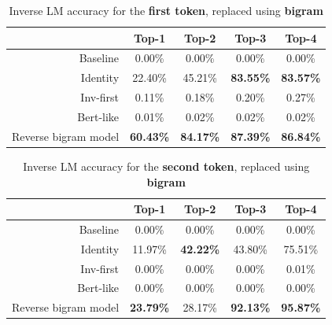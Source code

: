 \documentclass[../thesis.tex]{subfiles}
\begin{document}
\begin{table}[bthp]
\centering
\begin{tabular}{rcccc}
\toprule
          & \textbf{Top-1}   & \textbf{Top-2}   & \textbf{Top-3}   & \textbf{Top-4}   \\
\midrule
Baseline  & 0.00\%           & 0.00\%           & 0.00\%           & 0.00\%           \\
Identity  & 22.40\%          & 45.21\%          & \textbf{83.55\%} & \textbf{83.57\%} \\
Inv-first & 0.11\%           & 0.18\%           & 0.20\%           & 0.27\%           \\
Bert-like & 0.01\%           & 0.02\%           & 0.02\%           & 0.02\%           \\
Reverse bigram model & \textbf{60.43\%} & \textbf{84.17\%} & \textbf{87.39\%} & \textbf{86.84\%} \\
\bottomrule
\end{tabular}
\vspace{0.25cm}
\caption{Inverse LM accuracy for the \textbf{first token}, replaced using \textbf{bigram}}
\label{table:tinystories__inversion_first_token_bigram}
\end{table}


\begin{table}[bthp]
\centering
\begin{tabular}{rcccc}
\toprule
          & \textbf{Top-1} & \textbf{Top-2} & \textbf{Top-3} & \textbf{Top-4} \\
\midrule
Baseline  & 0.00\%         & 0.00\%         & 0.00\%         & 0.00\%         \\
Identity  & 11.97\%        & \textbf{42.22\%}        & 43.80\%        & 75.51\%        \\
Inv-first & 0.00\%         & 0.00\%         & 0.00\%         & 0.01\%         \\
Bert-like & 0.00\%         & 0.00\%         & 0.00\%         & 0.00\%         \\
Reverse bigram model  & \textbf{23.79\%}        & 28.17\%        & \textbf{92.13\%}        & \textbf{95.87\%}        \\
\bottomrule
\end{tabular}
\vspace{0.25cm}
\caption{Inverse LM accuracy for the \textbf{second token}, replaced using \textbf{bigram}}
\label{table:tinystories__inversion_second_token_bigram}
\end{table}
\end{document}

